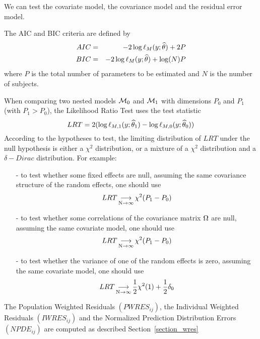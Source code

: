 We can test the covariate model, the covariance model and the residual error model.

 The
AIC and BIC criteria are defined by
\begin{eqnarray}
AIC &=& - 2 \log \ell_M(y;{\widehat{\theta}}) + 2 P \\
BIC &=& - 2 \log \ell_M(y;{\widehat{\theta}}) + \log(N) P
\end{eqnarray}
where $P$ is the total number of parameters to be estimated and $N$ is the number of subjects.

When comparing two nested models ${\cal M}_0$ and ${\cal M}_1$ with dimensions $P_0$ and $P_1$ (with $P_1>P_0$), the Likelihood Ratio Test uses the
test statistic
$$LRT = 2 ( \log \ell_{M,1}(y;{\widehat{\theta}}_1) -  \log \ell_{M,0}(y;{\widehat{\theta}}_0) )$$
According to the hypotheses to test, the limiting distribution of $LRT$ under the null hypothesis is either a $\chi ^2$ distribution, or a mixture of a $\chi^2$ distribution and a
$\delta-Dirac$ distribution. For example:
\begin{itemize}
\item[-] to test whether some fixed effects are null, assuming the same covariance structure of the random effects, one should use
$$LRT \mathop{\longrightarrow}\limits_{\mathrm{N\to \infty}}^{\mathrm{}} \chi^2(P_1-P_0) $$
\item[-] to test whether some correlations of the covariance matrix ${\Omega}$ are null, assuming the
same covariate model, one should use 
$$LRT \mathop{\longrightarrow}\limits_{\mathrm{N\to \infty}}^{\mathrm{}} \chi^2(P_1-P_0) $$
\item[-] to test whether the variance of one of the random effects is zero, assuming the
same covariate model, one should use
$$LRT \mathop{\longrightarrow}\limits_{\mathrm{N\to \infty}}^{\mathrm{}} \frac{1}{2} \chi^2(1) + \frac{1}{2}\delta_0 $$
\end{itemize}


 The Population Weighted Residuals $(PWRES_{ij})$,  the Individual Weighted Residuals $(IWRES_{ij})$
 and the Normalized Prediction Distribution Errors $(NPDE_{ij})$ are computed as described Section~\ref{section_wres}
